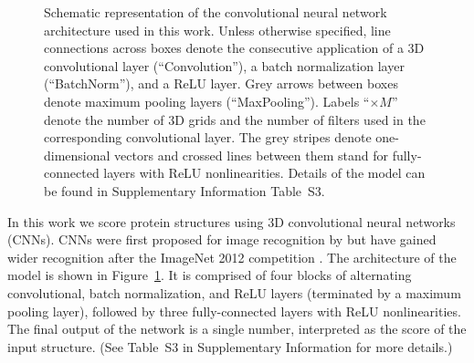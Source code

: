 \documentclass{bioinfo}
\begin{document}
\begin{figure}[t]
    \centerline{}
%
    \vspace{-10pt}
    \caption{Schematic representation of the convolutional neural
    network architecture used in this work. Unless otherwise specified, line connections across
    boxes denote the consecutive application of a 3D convolutional
    layer (``Convolution''), a batch normalization layer
    (``BatchNorm''), and a ReLU layer. Grey arrows between boxes denote
    maximum pooling layers (``MaxPooling''). Labels ``$\times M$''
    denote the number of 3D grids and the number of filters used in the corresponding
    convolutional layer.
    The grey stripes denote
    one-dimensional vectors and crossed lines between them stand for
    fully-connected layers with ReLU nonlinearities. Details of the
    model can be found in Supplementary Information Table~S3.}
    \label{Fig:CNNModel}
\end{figure}

In this work we score protein structures using 3D convolutional neural
networks (CNNs). CNNs were first proposed for image recognition by
\citet{lecun1989backpropagation} but have gained wider
recognition after the ImageNet 2012 competition
\citep{krizhevsky2012imagenet}. The architecture of the model is shown
in Figure~\ref{Fig:CNNModel}.  It is comprised of four blocks of
alternating convolutional, batch normalization, and ReLU layers
(terminated by a maximum pooling layer), followed by three
fully-connected layers with ReLU nonlinearities. The final output of
the network is a single number, interpreted as the score of the input
structure. (See Table~S3 in Supplementary Information for more
details.)
\end{document}
